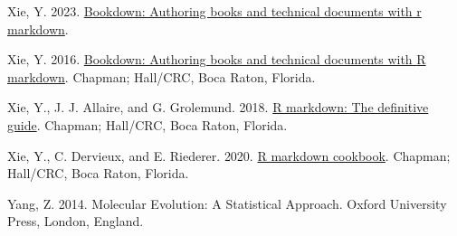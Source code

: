 \documentclass[fleqn,10pt,lineno]{wlpeerj} %
\newlength{\cslhangindent}
\newlength{\cslentryspacingunit} %
\newenvironment{CSLReferences}[2] %
 {%
  \setlength{\parindent}{0pt}
  \ifodd #1
  \let\oldpar\par
  \def\par{\hangindent=\cslhangindent\oldpar}
  \fi
  \setlength{\parskip}{#2\cslentryspacingunit}
 }%
 {}
\begin{document}
\begin{CSLReferences}{1}{0}
\leavevmode{}%
Xie, Y. 2023. \href{https://github.com/rstudio/bookdown}{Bookdown: Authoring books and technical documents with r markdown}.

\leavevmode{}%
Xie, Y. 2016. \href{https://bookdown.org/yihui/bookdown}{Bookdown: Authoring books and technical documents with {R} markdown}. Chapman; Hall/CRC, Boca Raton, Florida.

\leavevmode{}%
Xie, Y., J. J. Allaire, and G. Grolemund. 2018. \href{https://bookdown.org/yihui/rmarkdown}{R markdown: The definitive guide}. Chapman; Hall/CRC, Boca Raton, Florida.

\leavevmode{}%
Xie, Y., C. Dervieux, and E. Riederer. 2020. \href{https://bookdown.org/yihui/rmarkdown-cookbook}{R markdown cookbook}. Chapman; Hall/CRC, Boca Raton, Florida.

\leavevmode{}%
Yang, Z. 2014. Molecular {E}volution: A {S}tatistical {A}pproach. Oxford University Press, London, England.

\end{CSLReferences}
\end{document}
